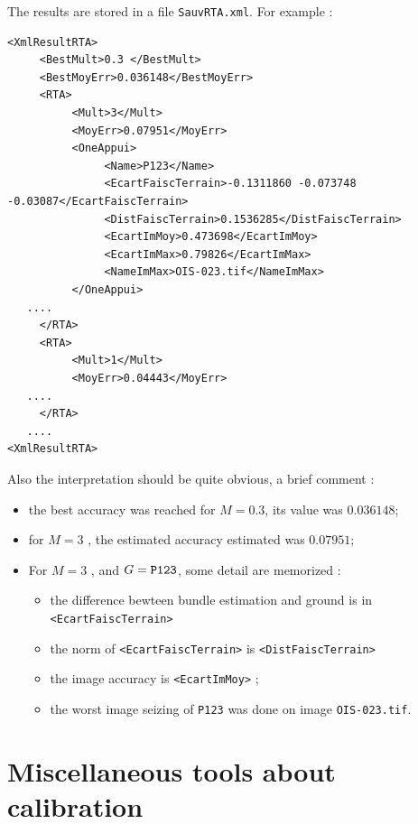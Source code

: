 The results are stored in a file {\tt SauvRTA.xml}. For example :

\begin{verbatim}
<XmlResultRTA>
     <BestMult>0.3 </BestMult>
     <BestMoyErr>0.036148</BestMoyErr>
     <RTA>
          <Mult>3</Mult>
          <MoyErr>0.07951</MoyErr>
          <OneAppui>
               <Name>P123</Name>
               <EcartFaiscTerrain>-0.1311860 -0.073748 -0.03087</EcartFaiscTerrain>
               <DistFaiscTerrain>0.1536285</DistFaiscTerrain>
               <EcartImMoy>0.473698</EcartImMoy>
               <EcartImMax>0.79826</EcartImMax>
               <NameImMax>OIS-023.tif</NameImMax>
          </OneAppui>
   ....
     </RTA>
     <RTA>
          <Mult>1</Mult>
          <MoyErr>0.04443</MoyErr>
   ....
     </RTA>
   ....
<XmlResultRTA>
\end{verbatim}

Also the interpretation should be quite obvious, a brief comment :

\begin{itemize}
   \item  the best accuracy was reached for $M=0.3$, its value was $0.036148$;

   \item for  $M=3$ , the estimated accuracy estimated was $0.07951$;

   \item For $M=3$ , and  $G={\tt P123}$, some detail are memorized :
   \begin{itemize}
       \item the  difference bewteen bundle estimation and ground is in {\tt <EcartFaiscTerrain>}
       \item the  norm of  {\tt <EcartFaiscTerrain>} is {\tt <DistFaiscTerrain>}
       \item the   image accuracy  is  {\tt  <EcartImMoy>} ;
       \item the   worst image seizing of {\tt P123} was done on image {\tt OIS-023.tif}.
   \end{itemize}
  
\end{itemize}



\section{Miscellaneous  tools about calibration}

